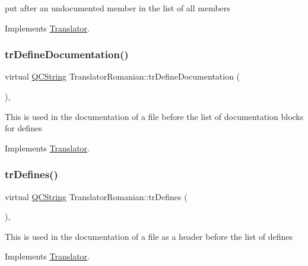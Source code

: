 put after an undocumented member in the list of all members 

Implements \mbox{\hyperlink{class_translator}{Translator}}.

\mbox{\label{class_translator_romanian_a9e9ee07bcfb1d2ae2753928252099435}} 
\subsubsection{\texorpdfstring{trDefineDocumentation()}{trDefineDocumentation()}}
{\footnotesize\ttfamily virtual \mbox{\hyperlink{class_q_c_string}{Q\+C\+String}} Translator\+Romanian\+::tr\+Define\+Documentation (\begin{DoxyParamCaption}{ }\end{DoxyParamCaption})\hspace{0.3cm}{\ttfamily [inline]}, {\ttfamily [virtual]}}

This is used in the documentation of a file before the list of documentation blocks for defines 

Implements \mbox{\hyperlink{class_translator}{Translator}}.

\mbox{\label{class_translator_romanian_a4680272666db5d8d3c04018a2c637dca}} 
\subsubsection{\texorpdfstring{trDefines()}{trDefines()}}
{\footnotesize\ttfamily virtual \mbox{\hyperlink{class_q_c_string}{Q\+C\+String}} Translator\+Romanian\+::tr\+Defines (\begin{DoxyParamCaption}{ }\end{DoxyParamCaption})\hspace{0.3cm}{\ttfamily [inline]}, {\ttfamily [virtual]}}

This is used in the documentation of a file as a header before the list of defines 

Implements \mbox{\hyperlink{class_translator}{Translator}}.

\mbox{\label{class_translator_romanian_ac258cbced506e3079a216c58909b819b}} 

